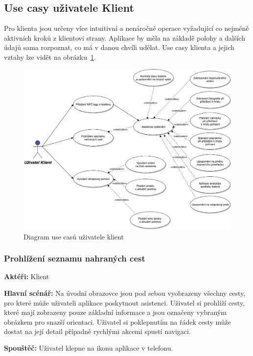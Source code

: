 \documentclass[czech,master,public,dept460,male,java,cpdeclaration]{diploma}
\newcommand{\usecase}[2]{\subsubsection{#1}\label{#2}}
\begin{document}
\subsection{Use casy uživatele Klient}
Pro klienta jsou určeny více intuitivní a nenáročné operace vyžadující co nejméně aktivních
kroků z klientovi strany. Aplikace by měla na základě polohy a dalších údajů sama rozpoznat,
co má v danou chvíli udělat. Use casy klienta a jejich vztahy lze vidět na obrázku~\ref{fig:UseCasesClient}.

\begin{figure}[H]
        \centering
                \includegraphics[scale=0.2]{img/UseCasesClient.png}
        \caption{Diagram use casů uživatele klient}
        \label{fig:UseCasesClient}
\end{figure}


\usecase{Prohlížení seznamu nahraných cest}{prohlizeniklient}
\textbf{Aktéři:} Klient

\vspace{0.1cm}
\noindent
\textbf{Hlavní scénář:} Na úvodní obrazovce jsou pod sebou vyobrazeny všechny cesty, pro které může
uživateli aplikace poskytnout asistenci. Uživatel si prohlíží cesty, které mají zobrazeny pouze
základní informace a jsou označeny vybraným obrázkem pro snazší orientaci. Uživatel si poklepnutím
na řádek cesty může dostat na její detail případně rychlými akcemi spustí navigaci.

\vspace{0.1cm}
\noindent
\textbf{Spouštěč:} Uživatel klepne na ikonu aplikace v telefonu.
\end{document}
